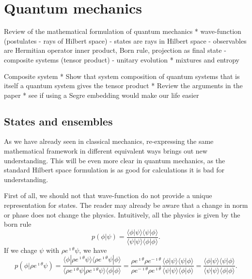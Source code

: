 

\def\>{\rangle}
\def\<{\langle}


\chapter{Quantum mechanics}


Review of the mathematical formulation of quantum mechanics
* wave-function (postulates - rays of Hilbert space)
- states are rays in Hilbert space
- observables are Hermitian operator inner product, Born rule, projection as final state
- composite systems (tensor product)
- unitary evolution
* mixtures and entropy

Composite system
* Show that system composition of quantum systems that is itself a quantum system gives the tensor product
* Review the arguments in the paper
* see if using a Segre embedding would make our life easier

\section{States and ensembles}

As we have already seen in classical mechanics, re-expressing the same mathematical framework in different equivalent ways brings out new understanding. This will be even more clear in quantum mechanics, as the standard Hilbert space formulation is as good for calculations it is bad for understanding.

First of all, we should not that wave-function do not provide a unique representation for states. The reader may already be aware that a change in norm or phase does not change the physics. Intuitively, all the physics is given by the born rule
\begin{equation}
	p(\phi|\psi) = \frac{\< \phi | \psi \>\< \psi | \phi \>}{\< \psi | \psi \>\< \phi | \phi \>}.
\end{equation}
If we chage $\psi$ with $\rho e^{\imath \theta} \psi$, we have
\begin{equation}
	p(\phi|\rho e^{\imath \theta}\psi) = \frac{\< \phi |\rho e^{\imath \theta}\psi \>\<\rho e^{\imath \theta}\psi | \phi \>}{\< \rho e^{\imath \theta}\psi | \rho e^{\imath \theta}\psi \>\< \phi | \phi \>} = \frac{\rho e^{\imath \theta}\rho e^{-\imath \theta}}{\rho e^{-\imath \theta}\rho e^{\imath \theta}}\frac{\< \phi | \psi \>\< \psi | \phi \>}{\< \psi | \psi \>\< \phi | \phi \>}=\frac{\< \phi | \psi \>\< \psi | \phi \>}{\< \psi | \psi \>\< \phi | \phi \>}.
\end{equation}

